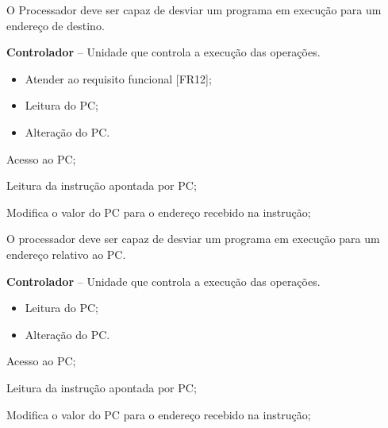 \documentclass{article}
\begin{document}
  O Processador deve ser capaz de desviar um programa em execução para um endereço de destino.
  \actors
    \begin{description}
     \item \textbf{Controlador} – Unidade que controla a execução das operações.
    \end{description}
    
  \preconditions 
    \begin{itemize}
     \item Atender ao requisito funcional [FR12];
     \item Leitura do PC;
    \end{itemize}

  \postconditions
    \begin{itemize}
     \item Alteração do PC.
    \end{itemize}
  
  
  \begin{mainflow}
    \item Acesso ao PC;
    \item Leitura da instrução apontada por PC;
    \item Modifica o valor do PC para o endereço recebido na instrução;
  \end{mainflow}
  
  O processador deve ser capaz de desviar um programa em execução para um endereço relativo ao PC.
  \actors
  \begin{description}
  	\item \textbf{Controlador} – Unidade que controla a execução das operações.
  \end{description}
  
  \preconditions 
  \begin{itemize}
  	\item Leitura do PC;
  \end{itemize}
  
  \postconditions
  \begin{itemize}
  	\item Alteração do PC.
  \end{itemize}
  
  
  \begin{mainflow}
  	\item Acesso ao PC;
  	\item Leitura da instrução apontada por PC;
  	\item Modifica o valor do PC para o endereço recebido na instrução;
  \end{mainflow}
  
\end{document}
